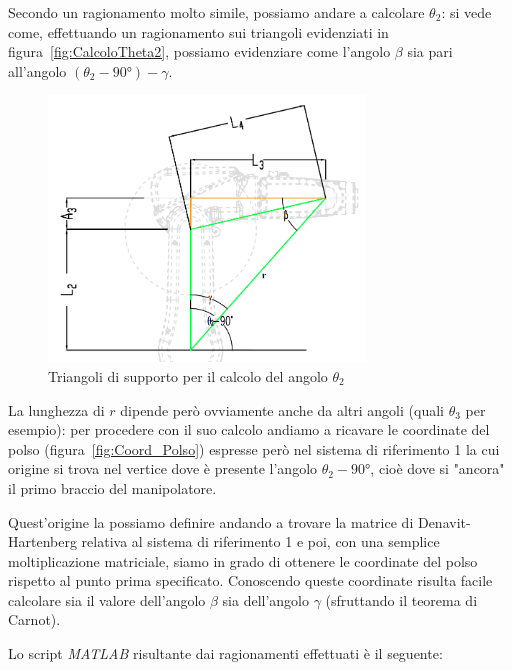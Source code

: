 Secondo un ragionamento molto simile, possiamo andare a calcolare $\theta_2$: si vede come, effettuando un ragionamento sui triangoli evidenziati in figura~\vref{fig:CalcoloTheta2}, possiamo evidenziare come l'angolo $\beta$ sia pari all'angolo $(\theta_2-\ang{90})-\gamma$.
\begin{figure}
	\centering
	\includegraphics[width=0.75\textwidth]{Immagini/Theta_2_2}
	\caption{Triangoli di supporto per il calcolo del angolo $\theta_2$} 
	\label{fig:CalcoloTheta2}
\end{figure}

La lunghezza di $r$ dipende però ovviamente anche da altri angoli (quali $\theta_3$ per esempio): per procedere con il suo calcolo andiamo a ricavare le coordinate del polso (figura~\vref{fig:Coord_Polso}) espresse però nel sistema di riferimento 1 la cui origine si trova nel vertice dove è presente l'angolo $\theta_2-\ang{90}$, cioè dove si "ancora" il primo braccio del manipolatore. 

Quest'origine la possiamo definire andando a trovare la matrice di Denavit-Hartenberg relativa al sistema di riferimento 1 e poi, con una semplice moltiplicazione matriciale, siamo in grado di ottenere le coordinate del polso rispetto al punto prima specificato. 
\newpage
Conoscendo queste coordinate risulta facile calcolare sia il valore dell'angolo $\beta$ sia dell'angolo $\gamma$ (sfruttando il teorema di Carnot). 

Lo script \emph{MATLAB} risultante dai ragionamenti effettuati è il seguente:


